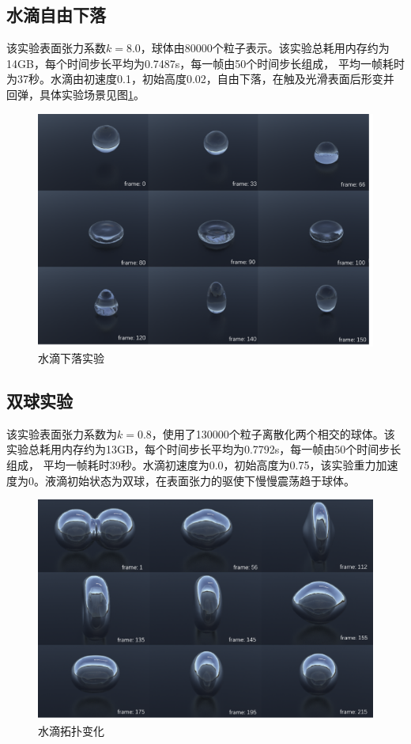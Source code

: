 \subsection{水滴自由下落}
该实验表面张力系数$k = 8.0$，球体由80000个粒子表示。该实验总耗用内存约为14GB，每个时间步长平均为0.7487s，每一帧由50个时间步长组成，
平均一帧耗时为37秒。水滴由初速度0.1，初始高度0.02，自由下落，在触及光滑表面后形变并回弹，具体实验场景见图\ref{fig: sphere Drop experience}。
\begin{figure}[htbp]
    \centering
    \includegraphics[scale=0.6]{./images/DropNotSplashEXP.png}
    \caption[水滴下落实验]{水滴下落实验}
    \label{fig: sphere Drop experience}
\end{figure}


\subsection{双球实验}
该实验表面张力系数为$k = 0.8$，使用了130000个粒子离散化两个相交的球体。该实验总耗用内存约为13GB，每个时间步长平均为0.7792s，每一帧由50个时间步长组成，
平均一帧耗时39秒。水滴初速度为0.0，初始高度为0.75，该实验重力加速度为0。液滴初始状态为双球，在表面张力的驱使下慢慢震荡趋于球体。
\begin{figure}[htbp]
    \centering
    \includegraphics[scale=0.56]{./images/DoubleSphere.png}
    \caption[水滴拓扑变化实验]{水滴拓扑变化}
    \label{fig: double sphere experience}
\end{figure}


